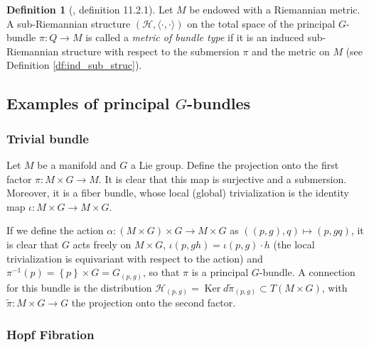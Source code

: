 \documentclass[12pt, letterpaper, reqno]{amsart}
\theoremstyle{definition}
\newtheorem{df}{Definition}
\theoremstyle{plain}
\theoremstyle{remark}
\begin{document}
\begin{df}[\cite{montgomery2002tour}, definition 11.2.1]
	Let $ M $ be endowed with a Riemannian metric. A sub-Riemannian structure $ (\mathcal{H}, \langle\cdot,\cdot\rangle) $ on the total space of the principal $ G $-bundle $ \pi: Q \rightarrow {M}
	$ is called a \textit{metric of bundle type} if it is an induced sub-Riemannian structure with respect to the submersion $ \pi $ and the metric on $ M $  (see Definition \ref{df:ind_sub_struc}).
\end{df}

\subsection{Examples of principal $ G $-bundles}%
\label{sub:examples_of_principal_g_bundles}

\subsubsection{Trivial bundle}%
\label{ssub:projection_of_cartesian_product_of_manifolds}

Let $ M$ be a manifold and $ G $ a Lie group. Define the projection onto the first factor $ \pi: M\times G \rightarrow M. $ It is clear that this map is surjective and a submersion. Moreover, it is a fiber bundle, whose local (global) trivialization is the identity map $ \iota : M\times G \rightarrow M\times G $.   

If we define the action $ \alpha: (M\times G) \times G \rightarrow M\times G $ as $ ((p, g),q)\mapsto (p,gq)  $, it is clear that $ G $ acts freely on $ M\times G $, $\iota(p, gh) = \iota(p,g)\cdot h $ (the local trivialization is equivariant with respect to the action) and $ \pi^{-1}(p) = \left\{ p \right\}\times G = G_{(p,g)} $, so that $ \pi $ is a principal $ G $-bundle. A connection for this bundle is the distribution $ \mathcal{H}_{(p,g)}= \operatorname{Ker} d\tilde{\pi}_(p,g)\subset T(M\times G) $, with $ \tilde{\pi}:M\times G \rightarrow G $ the projection onto the second factor.
\subsubsection{Hopf Fibration}%
\label{ssub:hopf_fibration}
\end{document}
